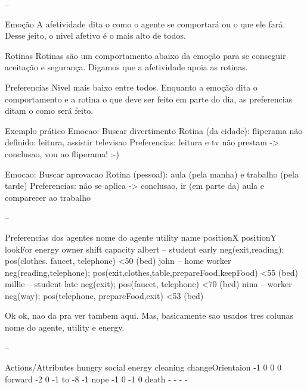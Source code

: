 --

Emoção
	A afetividade dita o como o agente se comportará ou o que ele fará.
	Desse jeito, o nivel afetivo é o mais alto de todos.

Rotinas
	Rotinas são um comportamento abaixo da emoção para se conseguir
	aceitação e segurança. Digamos que a afetividade apoia as rotinas.

Preferencias
	Nivel mais baixo entre todos. Enquanto a emoção dita o comportamento
	e a rotina o que deve ser feito em parte do dia, as preferencias ditam o
como será feito.

Exemplo prático	
	Emocao: Buscar divertimento
	Rotina (da cidade): fliperama
	não definido: leitura, assistir televisao
	Preferencias: leitura e tv não prestam
	 -> conclusao, vou ao fliperama! :-)

	Emocao: Buscar aprovacao
	Rotina (pessoal): aula (pela manha) e trabalho (pela tarde)
	Preferencias: não se aplica
	 -> conclusao, ir (em parte da) aula e comparecer ao trabalho

--

Preferencias dos agentes
nome do agente	utility	name	positionX	positionY	lookFor	energy	owner
shift	capacity
albert – student early	neg(exit,reading); pos(clothes. faucet, telephone)
<50 (bed)			
john – home worker	neg(reading,telephone);
pos(exit,clothes,table,prepareFood,keepFood)					<55 (bed)			
millie – student late	neg(exit); pos(faucet, telephone)
<70 (bed)			
nina – worker	neg(way); pos(telephone, prepareFood,exit)
<53 (bed)			

Ok ok, nao da pra ver tambem aqui. Mas, basicamente sao usados tres colunas
nome do agente, utility e energy.

--

Actions/Attributes	hungry	social	energy	cleaning
changeOrientaion	  -1      0        0       0
forward				  -2      0    -1 to -8	  -1
nope				  -1      0       -1       0
death				   -      -        -       -

